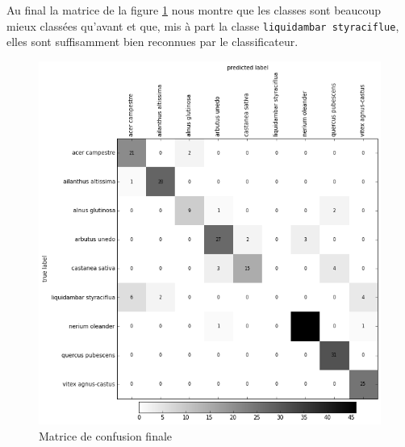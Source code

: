Au final la matrice de la figure \ref{mconf003} nous montre que les classes sont beaucoup mieux classées qu'avant et que, mis à part la classe \texttt{liquidambar styraciflue}, elles sont suffisamment bien reconnues par le classificateur.

\begin{figure}[h]
  \centering
    \includegraphics[width=0.6\linewidth]{img/mconf_003.png}
  \caption{Matrice de confusion finale}
  \label{mconf003}
\end{figure}



